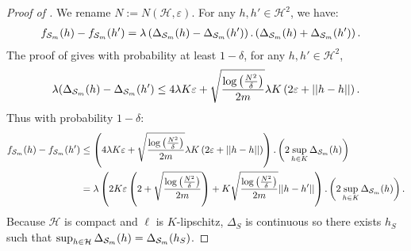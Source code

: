 \begin{noaddcontents}
\begin{proof}[Proof of ]
We rename $N:= N(\mathcal{H},\varepsilon)$.
For any $h,h'\in \mathcal{H}^2$, we have:
\begin{align*}
f_{\mathcal{S}_m}(h)-f_{\mathcal{S}_m}(h')  & = \lambda\left(\Delta_{\mathcal{S}_m}(h)- \Delta_{\mathcal{S}_m}(h')\right).\left(\Delta_{\mathcal{S}_m}(h)+ \Delta_{\mathcal{S}_m}(h')\right).
\end{align*}
The proof of  gives with probability at least $1-\delta$, for any $h,h'\in \mathcal{H}^2$,
\[\lambda(\Delta_{\mathcal{S}_m}(h)-\Delta_{\mathcal{S}_m}(h') \leq 4\lambda K \varepsilon + \sqrt{\frac{\log\left(\frac{N^2}{\delta}\right)}{2m}} \lambda K \left( 2\varepsilon+ ||h-h||\right).  \]
Thus with probability $1-\delta$:
\begin{align*}
f_{\mathcal{S}_m}(h)-f_{\mathcal{S}_m}(h') & \leq \left(4\lambda K \varepsilon + \sqrt{\frac{\log\left(\frac{N^2}{\delta}\right)}{2m}} \lambda K \left( 2\varepsilon+ ||h-h||\right) \right).\left(2 \sup_{h\in K} \Delta_{\mathcal{S}_m}(h)  \right) \\
& = \lambda \left(2K\varepsilon\left( 2 + \sqrt{\frac{\log\left(\frac{N^2}{\delta}\right)}{2m}}  \right) +  K\sqrt{\frac{\log\left(\frac{N^2}{\delta}\right)}{2m}}||h-h'|| \right).\left(2 \sup_{h\in K} \Delta_{\mathcal{S}_m}(h)  \right).
\end{align*}
Because $\mathcal{H}$ is compact and $\ell$ is $K$-lipschitz, $\Delta_S$ is continuous so there exists $h_S$ such that $\sup_{h\in \mathcal{H}} \Delta_{\mathcal{S}_m}(h)= \Delta_{\mathcal{S}_m}(h_S)$.
\medskip


\end{proof}
\end{noaddcontents}

